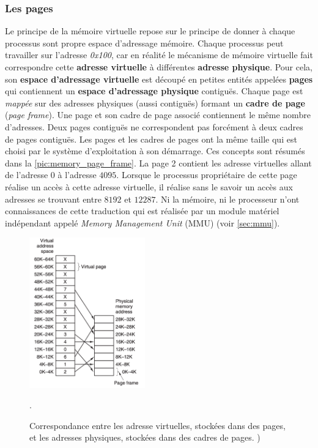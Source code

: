 \subsubsection{Les pages}
Le principe de la mémoire virtuelle repose sur le principe de donner à chaque processus sont propre espace d'adressage mémoire. Chaque processus peut travailler sur l'adresse \textit{0x100}, car en réalité le mécanisme de mémoire virtuelle fait correspondre cette \textbf{adresse virtuelle} à différentes \textbf{adresse physique}. Pour cela, son \textbf{espace d'adressage virtuelle} est découpé en petites entités appelées \textbf{pages} qui contiennent un \textbf{espace d'adressage physique} contiguës. Chaque page est \textit{mappée} sur des adresses physiques (aussi contiguës) formant un \textbf{cadre de page} (\textit{page frame}). Une page et son cadre de page associé contiennent le même nombre d'adresses. Deux pages contiguës ne correspondent pas forcément à deux cadres de pages contiguës. Les pages et les cadres de pages ont la même taille qui est choisi par le système d'exploitation à son démarrage. Ces concepts sont résumés dans la \autoref{pic:memory_page_frame}. La page 2 contient les adresse virtuelles allant de l'adresse $0$ à l'adresse $4095$. Lorsque le processus propriétaire de cette page réalise un accès à cette adresse virtuelle, il réalise sans le savoir un accès aux adresses se trouvant entre $8192$ et $12287$. Ni la mémoire, ni le processeur n'ont connaissances de cette traduction qui est réalisée par un module matériel indépendant appelé \textit{Memory Management Unit} (MMU) (voir \autoref{sec:mmu}). 

\begin{figure}
    \center
    \includegraphics[width=5cm]{images/memory_page_frame.png}
    \caption{\label{pic:memory_page_frame} Correspondance entre les adresse virtuelles, stockées dans des pages, et les adresses physiques, stockées dans des cadres de pages.  \cite{tanenbaum2008systeme})}.
\end{figure}


